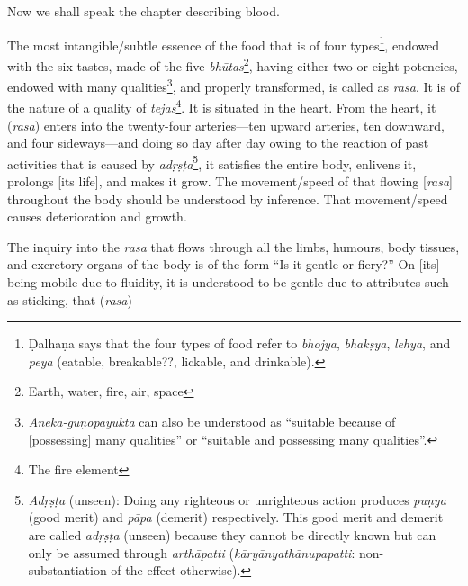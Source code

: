 \begin{translation}    
\item [1] Now we shall speak the chapter describing blood.

\item [2]

    
\item [3]    
    The most intangible/subtle essence of the food that is of four types\footnote{Ḍalhaṇa says that the four types of food
    refer to \emph{bhojya}, \emph{bhakṣya}, \emph{lehya}, and \emph{peya} (eatable, breakable??, lickable, and drinkable).}, endowed with
    the six tastes, made of the five \emph{bhūtas}\footnote{Earth, water, fire, air, space}, having either two or eight potencies, endowed
    with many qualities\footnote{\emph{Aneka-guṇopayukta} can also be understood as “suitable because of [possessing] many qualities”
    or “suitable and possessing many qualities”.}, and properly transformed, is called as \emph{rasa}. It is of the nature of a quality
    of \emph{tejas}\footnote{The fire element}. It is situated in the heart. From the heart, it (\emph{rasa}) enters into the twenty-four
    arteries—ten upward arteries, ten downward, and four sideways—and doing so day after day owing to the reaction of past activities
    that is caused by \emph{adṛṣṭa}\footnote{\emph{Adṛṣṭa} (unseen): Doing any righteous or unrighteous action produces \emph{puṇya}
    (good merit) and \emph{pāpa} (demerit) respectively. This good merit and demerit are called \emph{adṛṣṭa} (unseen) because they
    cannot be directly known but can only be assumed through \emph{arthāpatti} (\emph{kāryānyathānupapatti}: non-substantiation of the
    effect otherwise).}, it satisfies the entire body, enlivens it, prolongs [its life], and makes it grow. The movement/speed of that
    flowing [\emph{rasa}] throughout the body should be understood by inference. That movement/speed causes deterioration and growth. 
    
    The inquiry into the \emph{rasa} that flows through all the limbs, humours, body tissues, and excretory organs of the body is of
    the form “Is it gentle or fiery?” On [its] being mobile due to fluidity, it is understood to be gentle due to attributes such as
    sticking, that (\emph{rasa})

    
\item [4]  

\item [5]


\item [6]
\item [7]
   
\end{translation}

